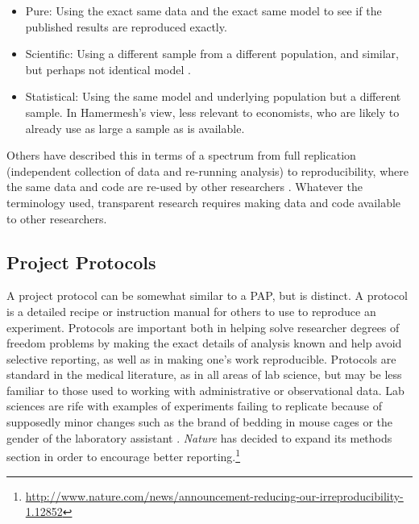 \documentclass[12pt] {article}
\begin{document}
\begin{itemize}
\item
  Pure: Using the exact same data and the exact same model to see if the
  published results are reproduced exactly.
\item
  Scientific: Using a different sample from a different population, and
  similar, but perhaps not identical model .
\item
  Statistical: Using the same model and underlying population but a
  different sample. In Hamermesh's view, less relevant to economists,
  who are likely to already use as large a sample as is available.
\end{itemize}

Others have described this in terms of a spectrum from full replication
(independent collection of data and re-running analysis) to
reproducibility, where the same data and code are re-used by other
researchers \citep{peng_reproducible_2011}. Whatever the terminology used, transparent
research requires making data and code available to other researchers.

\subsection{Project Protocols}\label{project-protocols}

A project protocol can be somewhat similar to a PAP, but is distinct. A protocol is a detailed recipe or instruction
manual for others to use to reproduce an experiment. Protocols are important both in helping solve researcher degrees of freedom problems by making the exact details of analysis known and help avoid selective reporting, as well as in making one's work reproducible. Protocols are standard in the medical literature, as in all areas of lab science,
but may be less familiar to those used to working with administrative or
observational data. Lab sciences are rife with examples of experiments failing to replicate because of supposedly minor changes such as the brand of bedding in mouse cages or the gender of the laboratory assistant \citep{sorge2014olfactory}. \textit{Nature} has decided to expand its methods section in order to encourage better reporting.\footnote{\url{http://www.nature.com/news/announcement-reducing-our-irreproducibility-1.12852}}
\end{document}
